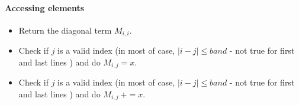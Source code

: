 \paragraph{Accessing elements}
\begin{itemize}
\item 
  \sshortdescribe Return the diagonal term $M_{i, i}$.
\item 
  \sshortdescribe Check if $j$ is a valid index (in most of case, $|i-j|\leq
  band $ - not true for first and last lines )
  and do $M_{i, j}=x$.
\item 
  \sshortdescribe Check if $j$ is a valid index (in most of case, $|i-j|\leq
  band $ - not true for first and last lines )
  and do $M_{i, j} \ +=x$.
\end{itemize}

